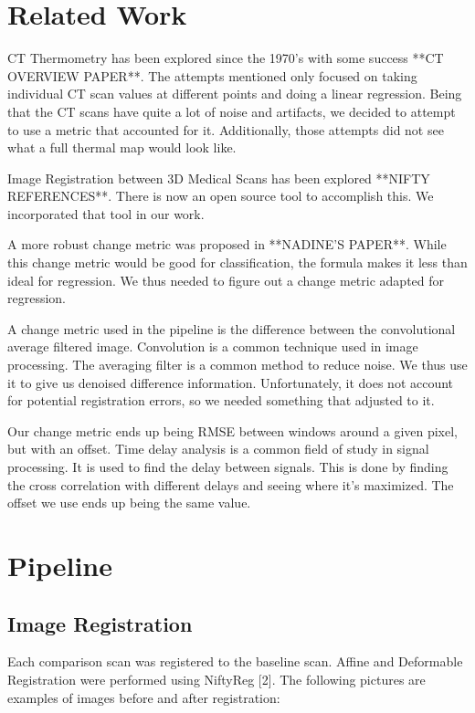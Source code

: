 \documentclass[]{spie}  %
\begin{document}
\section{Related Work}

CT Thermometry has been explored since the 1970's with some success **CT OVERVIEW PAPER**. The attempts mentioned only focused on taking individual CT scan values at different points and doing a linear regression. Being that the CT scans have quite a lot of noise and artifacts, we decided to attempt to use a metric that accounted for it. Additionally, those attempts did not see what a full thermal map would look like.

Image Registration between 3D Medical Scans has been explored **NIFTY REFERENCES**. There is now an open source tool to accomplish this. We incorporated that tool in our work.  

A more robust change metric was proposed in **NADINE'S PAPER**. While this change metric would be good for classification, the formula makes it less than ideal for regression. We thus needed to figure out a change metric adapted for regression.

A change metric used in the pipeline is the difference between the convolutional average filtered image. Convolution is a common technique used in image processing. The averaging filter is a common method to reduce noise. We thus use it to give us denoised difference information. Unfortunately, it does not account for potential registration errors, so we needed something that adjusted to it. 

Our change metric ends up being RMSE between windows around a given pixel, but with an offset. Time delay analysis is a common field of study in signal processing. It is used to find the delay between signals. This is done by finding the cross correlation with different delays and seeing where it's maximized. The offset we use ends up being the same value. 

\section{Pipeline}

\subsection{Image Registration} 

Each comparison scan was registered to the baseline scan. Affine and Deformable Registration were performed using NiftyReg [2]. The following pictures are examples of images before and after registration:
\end{document}
